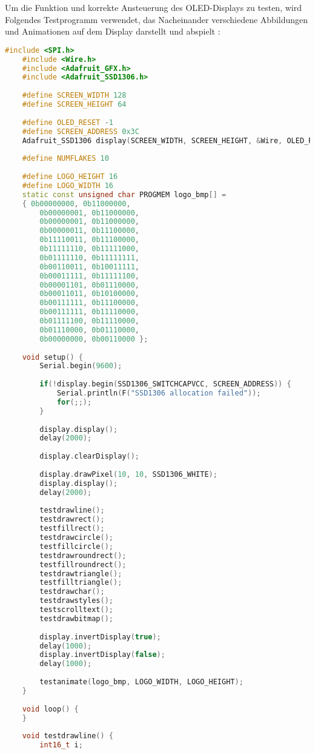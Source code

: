 Um die Funktion und korrekte Ansteuerung des OLED-Displays zu testen, wird Folgendes Testprogramm verwendet, das Nacheinander verschiedene Abbildungen und Animationen auf dem Display darstellt und abspielt \cite{RuiSantos.2016}:

\begin{code}
	\begin{lstlisting}[language=c++]
	#include <SPI.h>
	#include <Wire.h>
	#include <Adafruit_GFX.h>
	#include <Adafruit_SSD1306.h>
	
	#define SCREEN_WIDTH 128
	#define SCREEN_HEIGHT 64
	
	#define OLED_RESET -1
	#define SCREEN_ADDRESS 0x3C
	Adafruit_SSD1306 display(SCREEN_WIDTH, SCREEN_HEIGHT, &Wire, OLED_RESET);
	
	#define NUMFLAKES 10
	
	#define LOGO_HEIGHT 16
	#define LOGO_WIDTH 16
	static const unsigned char PROGMEM logo_bmp[] =
	{ 0b00000000, 0b11000000,
		0b00000001, 0b11000000,
		0b00000001, 0b11000000,
		0b00000011, 0b11100000,
		0b11110011, 0b11100000,
		0b11111110, 0b11111000,
		0b01111110, 0b11111111,
		0b00110011, 0b10011111,
		0b00011111, 0b11111100,
		0b00001101, 0b01110000,
		0b00011011, 0b10100000,
		0b00111111, 0b11100000,
		0b00111111, 0b11110000,
		0b01111100, 0b11110000,
		0b01110000, 0b01110000,
		0b00000000, 0b00110000 };
	
	void setup() {
		Serial.begin(9600);
		
		if(!display.begin(SSD1306_SWITCHCAPVCC, SCREEN_ADDRESS)) {
			Serial.println(F("SSD1306 allocation failed"));
			for(;;);
		}
		
		display.display();
		delay(2000);
		
		display.clearDisplay();
		
		display.drawPixel(10, 10, SSD1306_WHITE);
		display.display();
		delay(2000);
		
		testdrawline();
		testdrawrect();
		testfillrect();
		testdrawcircle();
		testfillcircle();
		testdrawroundrect();
		testfillroundrect();
		testdrawtriangle();
		testfilltriangle();
		testdrawchar();
		testdrawstyles();
		testscrolltext();
		testdrawbitmap();
		
		display.invertDisplay(true);
		delay(1000);
		display.invertDisplay(false);
		delay(1000);
		
		testanimate(logo_bmp, LOGO_WIDTH, LOGO_HEIGHT);
	}
	
	void loop() {
	}
	
	void testdrawline() {
		int16_t i;
		

\end{lstlisting}
\end{code}
